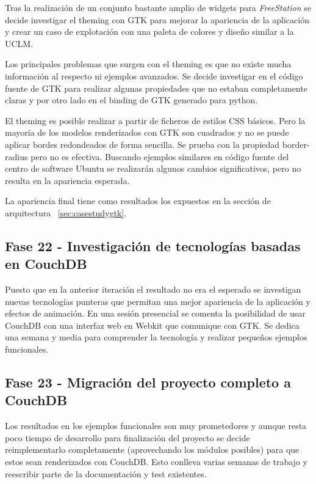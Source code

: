 Tras la realización de un conjunto bastante amplio de widgets para
\emph{FreeStation} se decide investigar el theming con GTK para mejorar la
apariencia de la aplicación y crear un caso de explotación con una paleta de
colores y diseño similar a la UCLM.

Los principales problemas que surgen con el theming es que no existe mucha
información al respecto ni ejemplos avanzados. Se decide investigar en el código
fuente de GTK para realizar algunas propiedades que no estaban completamente
claras y por otro lado en el binding de GTK generado para python.

El theming es posible realizar a partir de ficheros de estilos CSS básicos. Pero
la mayoría de los modelos renderizados con GTK son cuadrados y no se puede
aplicar bordes redondeados de forma sencilla. Se prueba con la propiedad
border-radius pero no es efectiva. Buscando ejemplos similares en código fuente
del centro de software Ubuntu se realizarán algunos cambios significativos, pero
no resulta en la apariencia esperada.

La apariencia final tiene como resultados los expuestos en la sección de
arquitectura ~\ref{sec:casestudygtk}.

\newpage

\subsection{Fase 22 - Investigación de tecnologías basadas en CouchDB}

Puesto que en la anterior iteración el resultado no era el esperado se
investigan nuevas tecnologías punteras que permitan una mejor apariencia de la
aplicación y efectos de animación. En una sesión presencial se comenta la
posibilidad de usar CouchDB con una interfaz web en Webkit que comunique con GTK. Se dedica una semana y media para
comprender la tecnología y realizar pequeños ejemplos funcionales.

\subsection{Fase 23 - Migración del proyecto completo a CouchDB}

Los resultados en los ejemplos funcionales son muy prometedores y aunque resta
poco tiempo de desarrollo para finalización del proyecto se decide
reimplementarlo completamente (aprovechando los módulos posibles) para que estos
sean renderizados con CouchDB. Esto conlleva varias semanas de trabajo y
reescribir parte de la documentación y test existentes.

